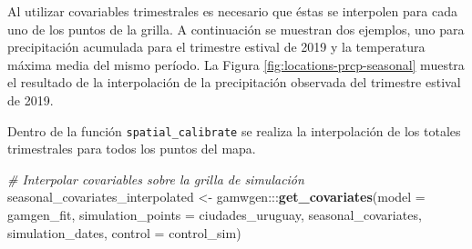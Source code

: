 \documentclass[
  12pt]{article}
\newenvironment{Shaded}{}{}
\newcommand{\CommentTok}[1]{\textcolor[rgb]{0.38,0.63,0.69}{\textit{#1}}}
\newcommand{\DataTypeTok}[1]{\textcolor[rgb]{0.56,0.13,0.00}{#1}}
\newcommand{\DecValTok}[1]{\textcolor[rgb]{0.25,0.63,0.44}{#1}}
\newcommand{\KeywordTok}[1]{\textcolor[rgb]{0.00,0.44,0.13}{\textbf{#1}}}
\newcommand{\NormalTok}[1]{#1}
\newcommand{\OperatorTok}[1]{\textcolor[rgb]{0.40,0.40,0.40}{#1}}
\newcommand{\StringTok}[1]{\textcolor[rgb]{0.25,0.44,0.63}{#1}}
\begin{document}
Al utilizar covariables trimestrales es necesario que éstas se interpolen para cada uno de los puntos de la grilla. A continuación se muestran dos ejemplos, uno para precipitación acumulada para el trimestre estival de 2019 y la temperatura máxima media del mismo período. La Figura \ref{fig:locations-prcp-seasonal} muestra el resultado de la interpolación de la precipitación observada del trimestre estival de 2019.

\begin{Shaded}
\end{Shaded}

Dentro de la función \texttt{spatial\_calibrate} se realiza la interpolación de los totales trimestrales para todos los puntos del mapa.

\begin{Shaded}
\begin{Highlighting}[]
\CommentTok{# Interpolar covariables sobre la grilla de simulación}
\NormalTok{seasonal_covariates_interpolated <-}
\StringTok{  }\NormalTok{gamwgen}\OperatorTok{:::}\KeywordTok{get_covariates}\NormalTok{(}\DataTypeTok{model =}\NormalTok{ gamgen_fit, }
                           \DataTypeTok{simulation_points =}\NormalTok{ ciudades_uruguay, }
\NormalTok{                           seasonal_covariates, }
\NormalTok{                           simulation_dates, }
                           \DataTypeTok{control =}\NormalTok{ control_sim)}
\end{Highlighting}
\end{Shaded}
\end{document}
